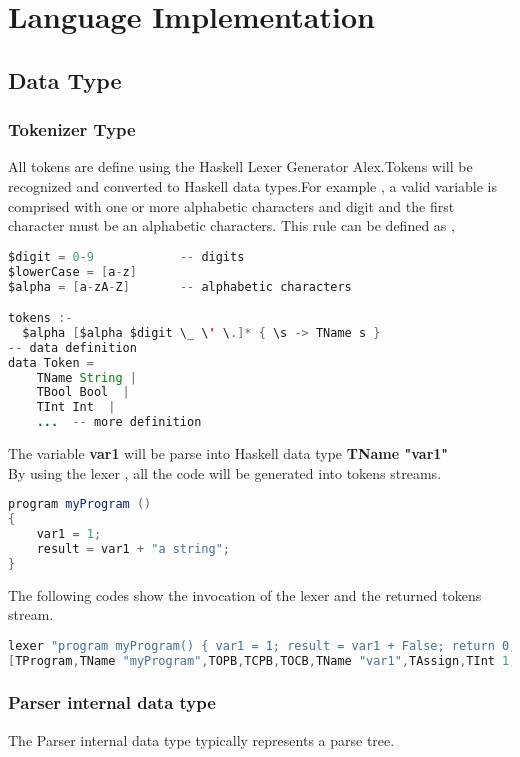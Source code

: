 \chapter{Language Implementation}


\section{Data Type}
\subsection{Tokenizer Type}
All tokens are define using the Haskell Lexer Generator Alex.Tokens will be recognized and converted to Haskell data types.For example , a valid variable is comprised with one or more alphabetic characters and digit and the first character must be an alphabetic characters. This rule can be defined as ,
\begin{lstlisting}[language=java]
$digit = 0-9			-- digits
$lowerCase = [a-z]
$alpha = [a-zA-Z]		-- alphabetic characters

tokens :-
  $alpha [$alpha $digit \_ \' \.]* { \s -> TName s }
-- data definition
data Token = 
	TName String |
	TBool Bool  | 
	TInt Int  | 
	...  -- more definition			

\end{lstlisting}

The variable \textbf{var1} will be parse into Haskell data type \textbf{TName "var1"}\\


By using the lexer , all the code will be generated into tokens streams.
\begin{lstlisting}[language=java]
program myProgram ()
{
	var1 = 1;
	result = var1 + "a string";
}
\end{lstlisting}

The following codes show the invocation of the lexer and the returned tokens stream.
\begin{lstlisting}[language=java]
lexer "program myProgram() { var1 = 1; result = var1 + False; return 0; }"
[TProgram,TName "myProgram",TOPB,TCPB,TOCB,TName "var1",TAssign,TInt 1,TSC,TName "result",TAssign,TName "var1",TPlus,TBool False,TSC,TReturn,TInt 0,TSC,TCCB]
\end{lstlisting}



\subsection{Parser internal data type}
The Parser internal data type typically represents a parse tree.



